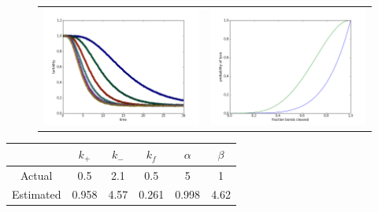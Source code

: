 \documentclass[11pt]{amsart}
\begin{document}
\begin{figure}[htbp] %
   \begin{tabular}{c c}
   \includegraphics[width=3.5in]{turbidity4.png}& 
   \includegraphics[width=3.5in]{susceptibility4.png}  
   \end{tabular}
\end{figure}

\begin{center}
    \begin{tabular}{ | c | c | c | c | c | c |}
    \hline
     & $k_{+}$ & $k_{-}$ & $k_{f}$ & $\alpha$ & $\beta$\\ \hline
    Actual & 0.5 & 2.1& 0.5  & 5 & 1\\ \hline
    Estimated & 0.958 & 4.57 & 0.261  & 0.998 & 4.62 \\ \hline
    \hline
    \end{tabular}
\end{center}
\end{document}
